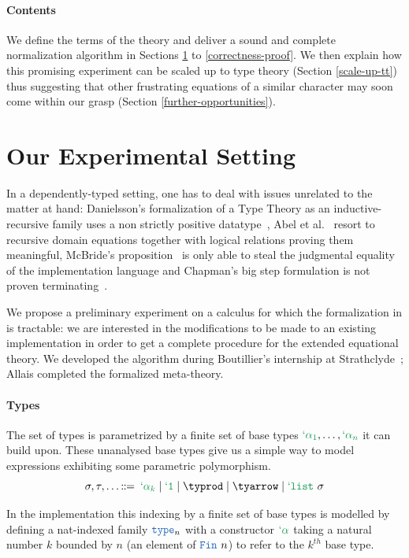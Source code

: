 \documentclass[preprint]{sigplanconf}
\begin{document}
\paragraph{Contents} We define the terms of the theory and deliver a sound and
complete normalization algorithm in Sections \ref{experimental-setting} to
\ref{correctness-proof}. We then explain how this promising experiment can be
scaled up to type theory (Section \ref{scale-up-tt}) thus suggesting that
other frustrating equations of a similar character may soon come within our
grasp (Section \ref{further-opportunities}).


\section{Our Experimental Setting}
\label{experimental-setting}

In a dependently-typed setting, one has to deal with issues unrelated to the
matter at hand: Danielsson's formalization of a Type Theory as an
inductive-recursive family uses a non strictly positive
datatype~\cite{NadNbeDep}, Abel et al.~\cite{NbeDep1} resort to
recursive domain equations together with logical relations proving them
meaningful, McBride's proposition~\cite{McBride2010Outrageous} is only able
to steal the judgmental equality of the implementation language and Chapman's
big step formulation is not proven terminating~\cite{ChapmanPhd}.

We propose a preliminary experiment on a calculus for which the formalization
in \agda{} is tractable: we are interested in the modifications to be made to
an existing implementation in order to get a complete procedure for the extended
equational theory. We developed the algorithm during Boutillier's internship
at Strathclyde~\cite{LambList}; Allais completed the formalized meta-theory.

\paragraph{Types} The set of types is parametrized by a finite set of
base types $\tybase[1], \dots, \tybase[n]$ it can build upon. These
unanalysed base types give us a simple way to model expressions
exhibiting some parametric polymorphism.
$$\sigma, \tau, \dots \gramdecl
           \tybase
  \mid \tyunit
  \mid \typrod
  \mid \tyarrow
  \mid \tylist$$
\begin{remark} In the \agda{} implementation this
indexing by a finite set of base types is modelled by defining a
nat-indexed family $\type$ with a constructor $\tybase[]$ taking a
natural number $k$ bounded by $n$ (an element of $\fin$) to refer to
the $k^{th}$ base type.
\end{remark}
\end{document}
